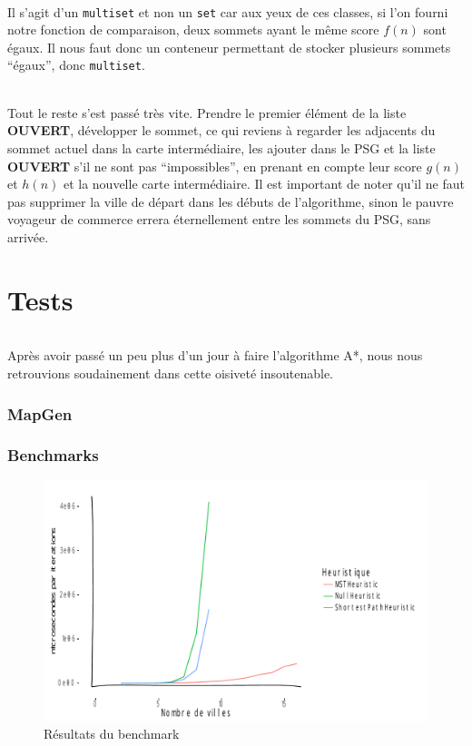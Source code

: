 \documentclass[french]{article}
\begin{document}
\paragraph{} Il s'agit d'un \texttt{multiset} et non un \texttt{set} car aux
yeux de ces classes, si l'on fourni notre fonction de comparaison, deux sommets
ayant le même score $f(n)$ sont égaux. Il nous faut donc un conteneur
permettant de stocker plusieurs sommets ``égaux'', donc \texttt{multiset}.

\paragraph{} Tout le reste s'est passé très vite. Prendre le premier élément de
la liste \textbf{\huge{OUVERT}}, développer le sommet, ce qui reviens à
regarder les adjacents du sommet actuel dans la carte intermédiaire, les
ajouter dans le PSG et la liste \textbf{\Huge{OUVERT}} s'il ne sont pas
``impossibles'', en prenant en compte leur score $g(n)$ et $h(n)$ et la
nouvelle carte intermédiaire. Il est important de noter qu'il ne faut pas
supprimer la ville de départ dans les débuts de l'algorithme, sinon le pauvre
voyageur de commerce errera éternellement entre les sommets du PSG, sans
arrivée.

\part{Tests}

\paragraph{} Après avoir passé un peu plus d'un jour à faire l'algorithme A*,
nous nous retrouvions soudainement dans cette oisiveté insoutenable.

\section{MapGen}

\section{Benchmarks}

\begin{figure}[H]
	\centering
	\includegraphics[scale=0.8]{graphs/benchmarks.pdf}
	\caption{Résultats du benchmark}
	\label{fig:benchmarks}
\end{figure}
\end{document}
